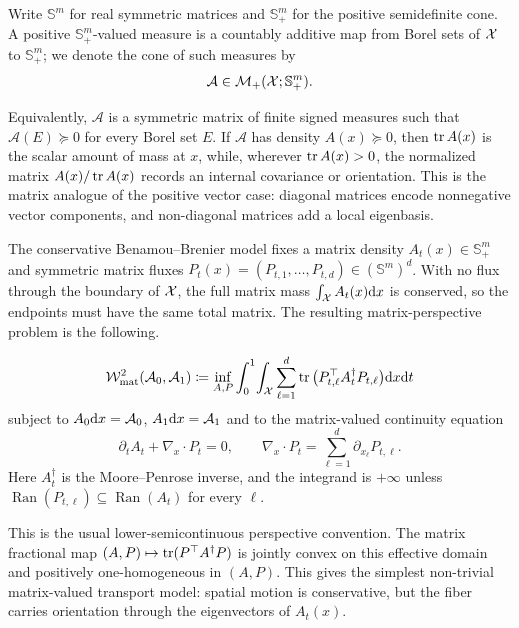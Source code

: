 \begin{defn}\label{def-positive-matrix-valued-measure}
	Write $\mathbb S^m$ for real symmetric matrices and $\mathbb S_+^m$ for the positive semidefinite cone. A positive $\mathbb S_+^m$-valued measure is a countably additive map from Borel sets of $\mathcal{X}$ to $\mathbb S_+^m$; we denote the cone of such measures by
	\[
		\mathcal A\in\mathcal{M}_+(\mathcal{X};\mathbb S_+^m).
	\]
\end{defn}
Equivalently, $\mathcal A$ is a symmetric matrix of finite signed measures such that $\mathcal A(E)\succeq0$ for every Borel set $E$. If $\mathcal A$ has density $A(x)\succeq0$, then $\operatorname{tr} A(x)$ is the scalar amount of mass at $x$, while, wherever $\operatorname{tr} A(x)>0$, the normalized matrix $A(x)/\operatorname{tr} A(x)$ records an internal covariance or orientation. This is the matrix analogue of the positive vector case: diagonal matrices encode nonnegative vector components, and non-diagonal matrices add a local eigenbasis.

The conservative Benamou--Brenier model fixes a matrix density $A_t(x)\in\mathbb S_+^m$ and symmetric matrix fluxes $P_t(x)=(P_{t,1},\ldots,P_{t,d})\in(\mathbb S^m)^d$. With no flux through the boundary of $\mathcal{X}$, the full matrix mass $\int_{\mathcal{X}} A_t(x)\mathrm{d} x$ is conserved, so the endpoints must have the same total matrix. The resulting matrix-perspective problem is the following.
\begin{defn}\label{def-matrix-valued-dynamic-transport}
\begin{equation}\label{eq-matrix-valued-bb}
\begin{aligned}
\mathcal W_{\mathrm{mat}}^2(\mathcal A_0,\mathcal A_1)
\coloneqq
\inf_{A,P}\int_0^1\!\int_{\mathcal{X}}
\sum_{\ell=1}^d \operatorname{tr}\big(P_{t,\ell}^{\top} A_t^\dagger P_{t,\ell}\big)\mathrm{d} x\mathrm{d} t
\end{aligned}
\end{equation}
subject to $A_0\mathrm{d} x=\mathcal A_0$, $A_1\mathrm{d} x=\mathcal A_1$ and to the matrix-valued continuity equation
\begin{equation}\label{eq-matrix-valued-continuity}
\partial_t A_t+\nabla_x\cdot P_t=0,
\qquad
\nabla_x\cdot P_t=\sum_{\ell=1}^d \partial_{x_\ell}P_{t,\ell}.
\end{equation}
Here $A_t^\dagger$ is the Moore--Penrose inverse, and the integrand is $+\infty$ unless
$\operatorname{Ran}(P_{t,\ell})\subseteq\operatorname{Ran}(A_t)$ for every $\ell$.
\end{defn}
This is the usual lower-semicontinuous perspective convention. The matrix fractional map $(A,P)\mapsto\operatorname{tr}(P^{\top}A^\dagger P)$ is jointly convex on this effective domain and positively one-homogeneous in $(A,P)$. This gives the simplest non-trivial matrix-valued transport model: spatial motion is conservative, but the fiber carries orientation through the eigenvectors of $A_t(x)$.

